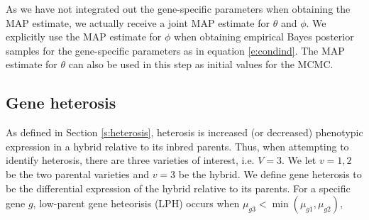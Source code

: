 \documentclass[useAMS,usenatbib,referee]{biom}
\begin{document}
As we have not integrated out the gene-specific parameters when obtaining the MAP estimate, we actually receive a joint MAP estimate for $\theta$ and $\phi$. We explicitly use the MAP estimate for $\phi$ when obtaining empirical Bayes posterior samples for the gene-specific parameters as in equation \eqref{e:condind}. The MAP estimate for $\theta$ can also be used in this step as initial values for the MCMC. 

\subsection{Gene heterosis}
\label{s:gene_heterosis}



As defined in Section \ref{s:heterosis}, heterosis is increased (or decreased) phenotypic expression in a hybrid relative to its inbred parents. Thus, when attempting to identify heterosis, there are three varieties of interest, i.e. $V=3$. We let $v=1,2$ be the two parental varieties and $v=3$ be the hybrid. We define gene heterosis to be the differential expression of the hybrid relative to its parents. For a specific gene $g$, low-parent gene heteorisis (LPH) occurs when $\mu_{g3}< \min(\mu_{g1},\mu_{g2})$, 

\end{document}
